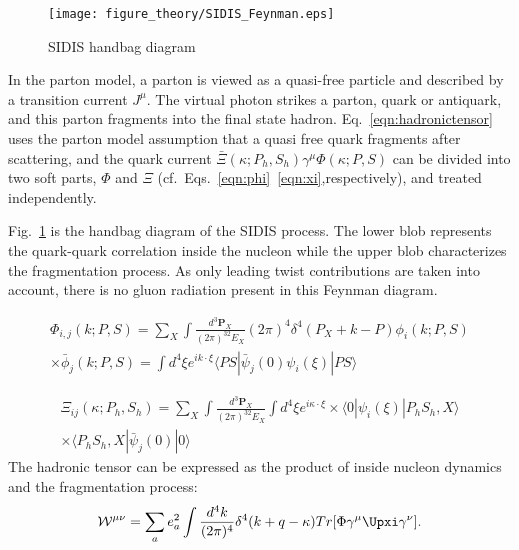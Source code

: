 \begin{figure}[ht]
  \centering
  \texttt{[image: figure\_theory/SIDIS\_Feynman.eps]}
  \caption{SIDIS handbag diagram}
  \label{fig:SIDISbulb}
\end{figure}
In the parton model, a parton is viewed as a quasi-free particle and described by a transition current $J^{\mu}$. The virtual photon strikes a parton, quark or antiquark, and this parton fragments into the final state hadron. Eq.~\eqref{eqn:hadronictensor} uses the parton model assumption that a quasi free quark fragments after scattering, and the quark current $\bar{\Xi}(\kappa;P_h,S_h)\gamma^\mu\Phi(\kappa;P,S)$ can be divided into two soft parts, $\Phi$ and $\Xi$ (cf.~Eqs.~\ref{eqn:phi}~\ref{eqn:xi},respectively), and treated independently. 

Fig.~\ref{fig:SIDISbulb} is the handbag diagram of the SIDIS process. The lower blob represents the quark-quark correlation inside the nucleon while the upper blob characterizes the fragmentation process. As only leading twist contributions are taken into account, there is no gluon radiation present in this Feynman diagram. 
  
\begin{equation}
  \begin{split}\Phi_{i,j}(k;P,S)=\sum_X\int\frac{d^3\boldsymbol{P}_X}{(2\pi)^32E_X}(2\pi)^4\delta^4(P_X+k-P)\phi_i(k;P,S)\\ \times \bar{\phi}_j(k;P,S)
=\int d^4\xi e^{ik\cdot\xi}\langle PS|\bar{\psi}_j(0)\psi_i(\xi)|PS\rangle
\label{eqn:phi}
  \end{split}
\end{equation}

\begin{equation}
\begin{split}
\Xi_{ij}(\kappa;P_h,S_h) %
=  \sum_X\int\frac{d^3\boldsymbol{P}_X}{(2\pi)^32E_X}\int d^4\xi e^{i\kappa\cdot\xi}\times\langle 0|\psi_i(\xi)|P_hS_h,X\rangle \\
\times \langle P_hS_h,X|\bar{\psi}_j(0)|0\rangle
\label{eqn:xi}
\end{split}
\end{equation}
 The hadronic tensor can be expressed as the product of inside nucleon dynamics and the fragmentation process:
\begin{equation}
\mathcal{W}^{\mu\nu}  = \sum_ae_a^2\int\frac{d^4k}{(2\pi)^4}\delta^4(k+q-\kappa)Tr[\Phi\gamma^{\mu}\Upxi\gamma^{\nu}].
\label{eqn:hadronictensor3}
\end{equation}

